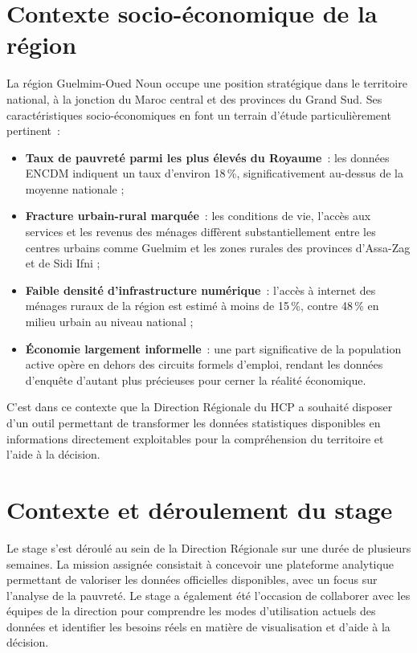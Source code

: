 \documentclass[12pt,a4paper]{report}
\begin{document}
\section{Contexte socio-économique de la région}

La région Guelmim-Oued Noun occupe une position stratégique dans le territoire national, à la jonction du Maroc central et des provinces du Grand Sud. Ses caractéristiques socio-économiques en font un terrain d'étude particulièrement pertinent~:

\begin{itemize}
  \item \textbf{Taux de pauvreté parmi les plus élevés du Royaume}~: les données ENCDM indiquent un taux d'environ 18\,\%, significativement au-dessus de la moyenne nationale ;
  \item \textbf{Fracture urbain-rural marquée}~: les conditions de vie, l'accès aux services et les revenus des ménages diffèrent substantiellement entre les centres urbains comme Guelmim et les zones rurales des provinces d'Assa-Zag et de Sidi Ifni ;
  \item \textbf{Faible densité d'infrastructure numérique}~: l'accès à internet des ménages ruraux de la région est estimé à moins de 15\,\%, contre 48\,\% en milieu urbain au niveau national ;
  \item \textbf{Économie largement informelle}~: une part significative de la population active opère en dehors des circuits formels d'emploi, rendant les données d'enquête d'autant plus précieuses pour cerner la réalité économique.
\end{itemize}

C'est dans ce contexte que la Direction Régionale du HCP a souhaité disposer d'un outil permettant de transformer les données statistiques disponibles en informations directement exploitables pour la compréhension du territoire et l'aide à la décision.

\section{Contexte et déroulement du stage}

Le stage s'est déroulé au sein de la Direction Régionale sur une durée de plusieurs semaines. La mission assignée consistait à concevoir une plateforme analytique permettant de valoriser les données officielles disponibles, avec un focus sur l'analyse de la pauvreté. Le stage a également été l'occasion de collaborer avec les équipes de la direction pour comprendre les modes d'utilisation actuels des données et identifier les besoins réels en matière de visualisation et d'aide à la décision.
\end{document}
